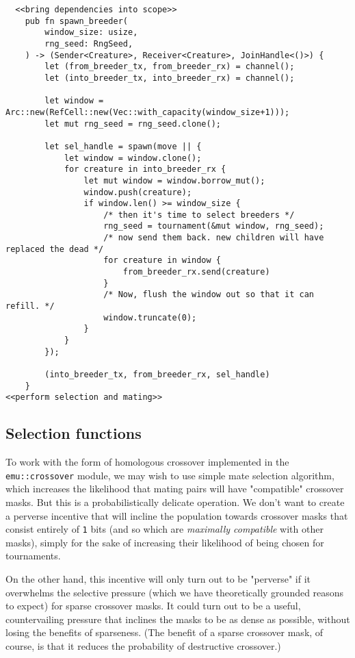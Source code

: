 \documentclass[11pt]{article}
\begin{document}
\lstset{language=rust,label=org7a49500,caption= ,captionpos=b,numbers=none}
\begin{lstlisting}
  <<bring dependencies into scope>>
    pub fn spawn_breeder(
        window_size: usize,
        rng_seed: RngSeed,
    ) -> (Sender<Creature>, Receiver<Creature>, JoinHandle<()>) {
        let (from_breeder_tx, from_breeder_rx) = channel();
        let (into_breeder_tx, into_breeder_rx) = channel();

        let window = Arc::new(RefCell::new(Vec::with_capacity(window_size+1)));
        let mut rng_seed = rng_seed.clone();

        let sel_handle = spawn(move || {
            let window = window.clone();
            for creature in into_breeder_rx {
                let mut window = window.borrow_mut();
                window.push(creature);
                if window.len() >= window_size {
                    /* then it's time to select breeders */
                    rng_seed = tournament(&mut window, rng_seed);
                    /* now send them back. new children will have replaced the dead */
                    for creature in window {
                        from_breeder_rx.send(creature)
                    }
                    /* Now, flush the window out so that it can refill. */
                    window.truncate(0);
                }
            }
        });

        (into_breeder_tx, from_breeder_rx, sel_handle)
    }
<<perform selection and mating>>
\end{lstlisting}

\subsection{Selection functions}
\label{sec:orge1d6443}

To work with the form of homologous crossover implemented in the
\texttt{emu::crossover} module, we may wish to use simple mate selection
algorithm, which increases the likelihood that mating pairs will
have "compatible" crossover masks. But this is a probabilistically
delicate operation. We don't want to create a perverse incentive
that will incline the population towards crossover masks that consist
entirely of \texttt{1} bits (and so which are \emph{maximally compatible} with other
masks), simply for the sake of increasing their likelihood of being
chosen for tournaments. 

On the other hand, this incentive will only turn out to be "perverse"
if it overwhelms the selective pressure (which we have theoretically
grounded reasons to expect) for sparse crossover masks. It could turn
out to be a useful, countervailing pressure that inclines the masks
to be as dense as possible, without losing the benefits of sparseness.
(The benefit of a sparse crossover mask, of course, is that it reduces
the probability of destructive crossover.)
\end{document}
